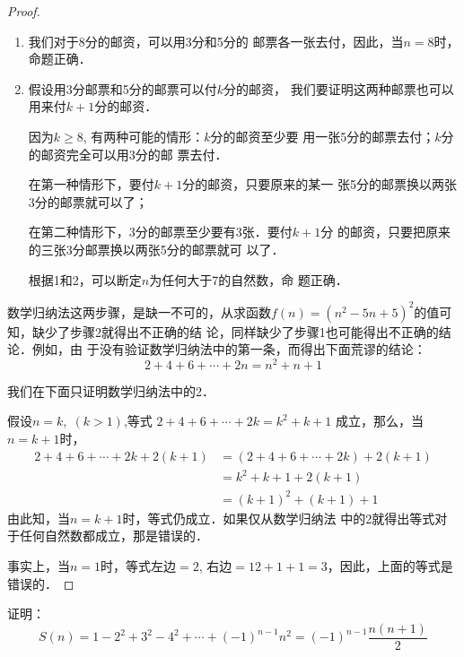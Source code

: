 \begin{proof}
\begin{enumerate}
    \item 我们对于8分的邮资，可以用3分和5分的
    邮票各一张去付，因此，当$n=8$时，命题正确．
    \item 假设用3分邮票和5分的邮票可以付$k$分的邮资，
    我们要证明这两种邮票也可以用来付$k+1$分的邮资．

    因为$k\ge 8$, 有两种可能的情形：$k$分的邮资至少要
    用一张5分的邮票去付；$k$分的邮资完全可以用3分的邮
    票去付．

    在第一种情形下，要付$k+1$分的邮资，只要原来的某一
    张5分的邮票换以两张3分的邮票就可以了；

    在第二种情形下，3分的邮票至少要有3张．要付$k+1$分
    的邮资，只要把原来的三张3分邮票换以两张5分的邮票就可
    以了．

    根据1和2，可以断定$n$为任何大于7的自然数，命
    题正确．
\end{enumerate}


数学归纳法这两步骤，是缺一不可的，从求函数$f(n)=
(n^2-5n+5)^2$的值可知，缺少了步骤2就得出不正确的结
论，同样缺少了步骤1也可能得出不正确的结论．例如，由
于没有验证数学归纳法中的第一条，而得出下面荒谬的结论：
\[2+4+6+\cdots+2n=n^2+n+1\]

我们在下面只证明数学归纳法中的2．

假设$n=k,\; (k>1)$,等式
$2+4+6+\cdots+2k=k^2+k+1$
成立，那么，当$n=k+1$时，
\begin{align*}
    2+4+6+\cdots+2k+2(k+1)&=(2+4+6+\cdots+2k)+2(k+1)\\
&=k^2+k+1+2(k+1)  \tag{数学归纳法假设}\\
&=(k+1)^2+(k+1)+1
\end{align*}
由此知，当$n=k+1$时，等式仍成立．如果仅从数学归纳法
中的2就得出等式对于任何自然数都成立，那是错误的．

事实上，当$n=1$时，等式左边$=2$, 右边$=12+1+1=
3$，因此，上面的等式是错误的．
\end{proof}

\begin{example}
    证明：
\[S(n)=1-2^2+3^2-4^2+\cdots+(-1)^{n-1}n^2=(-1)^{n-1}\frac{n(n+1)}{2}\]
\end{example}

